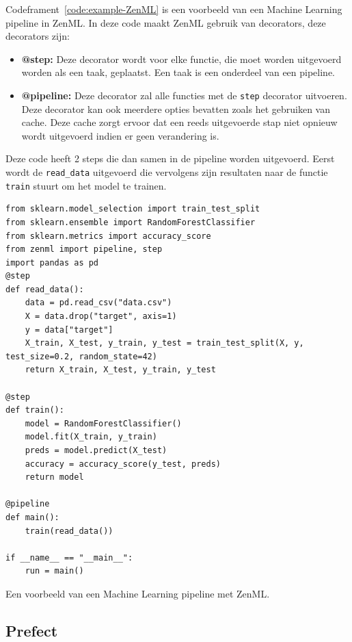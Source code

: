 Codeframent~\ref{code:example-ZenML} is een voorbeeld van een Machine Learning pipeline in ZenML. In deze code maakt ZenML gebruik van decorators, deze decorators zijn:
\begin{itemize}
    \item \textbf{@step:} Deze decorator wordt voor elke functie, die moet worden uitgevoerd worden als een taak, geplaatst. Een taak is een onderdeel van een pipeline.
    \item \textbf{@pipeline:} Deze decorator zal alle functies met de \texttt{step} decorator uitvoeren. Deze decorator kan ook meerdere opties bevatten zoals het gebruiken van cache. Deze cache zorgt ervoor dat een reeds uitgevoerde stap niet opnieuw wordt uitgevoerd indien er geen verandering is.
\end{itemize}

Deze code heeft 2 steps die dan samen in de pipeline worden uitgevoerd. Eerst wordt de \texttt{read\_data} uitgevoerd die vervolgens zijn resultaten naar de functie \texttt{train} stuurt om het model te trainen.

\begin{listing}
\begin{verbatim}
from sklearn.model_selection import train_test_split
from sklearn.ensemble import RandomForestClassifier
from sklearn.metrics import accuracy_score
from zenml import pipeline, step
import pandas as pd
@step
def read_data():
    data = pd.read_csv("data.csv")
    X = data.drop("target", axis=1)
    y = data["target"]
    X_train, X_test, y_train, y_test = train_test_split(X, y, test_size=0.2, random_state=42)
    return X_train, X_test, y_train, y_test

@step    
def train():
    model = RandomForestClassifier()
    model.fit(X_train, y_train)
    preds = model.predict(X_test)
    accuracy = accuracy_score(y_test, preds)
    return model

@pipeline
def main():
    train(read_data())

if __name__ == "__main__":
    run = main()
\end{verbatim}
\caption[Voorbeeld van een Machine Learning pipeline met ZenML.]{\label{code:example-ZenML}Een voorbeeld van een Machine Learning pipeline met ZenML.}
\end{listing}

\subsection{Prefect}
\label{subsec:prefect}


